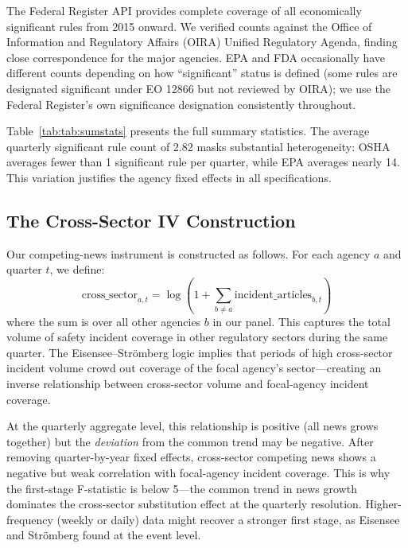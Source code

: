 \documentclass[12pt]{article}
\begin{document}
The Federal Register API provides complete coverage of all economically significant rules from 2015 onward. We verified counts against the Office of Information and Regulatory Affairs (OIRA) Unified Regulatory Agenda, finding close correspondence for the major agencies. EPA and FDA occasionally have different counts depending on how ``significant'' status is defined (some rules are designated significant under EO 12866 but not reviewed by OIRA); we use the Federal Register's own significance designation consistently throughout.

Table~\ref{tab:tab:sumstats} presents the full summary statistics. The average quarterly significant rule count of 2.82 masks substantial heterogeneity: OSHA averages fewer than 1 significant rule per quarter, while EPA averages nearly 14. This variation justifies the agency fixed effects in all specifications.



\subsection{The Cross-Sector IV Construction}

Our competing-news instrument is constructed as follows. For each agency $a$ and quarter $t$, we define:
\begin{equation}
\text{cross\_sector}_{a,t} = \log\left(1 + \sum_{b \neq a} \text{incident\_articles}_{b,t}\right)
\end{equation}
where the sum is over all other agencies $b$ in our panel. This captures the total volume of safety incident coverage in other regulatory sectors during the same quarter. The Eisensee--Str{\"o}mberg logic implies that periods of high cross-sector incident volume crowd out coverage of the focal agency's sector---creating an inverse relationship between cross-sector volume and focal-agency incident coverage.

At the quarterly aggregate level, this relationship is positive (all news grows together) but the \emph{deviation} from the common trend may be negative. After removing quarter-by-year fixed effects, cross-sector competing news shows a negative but weak correlation with focal-agency incident coverage. This is why the first-stage F-statistic is below 5---the common trend in news growth dominates the cross-sector substitution effect at the quarterly resolution. Higher-frequency (weekly or daily) data might recover a stronger first stage, as Eisensee and Str{\"o}mberg found at the event level.
\end{document}
